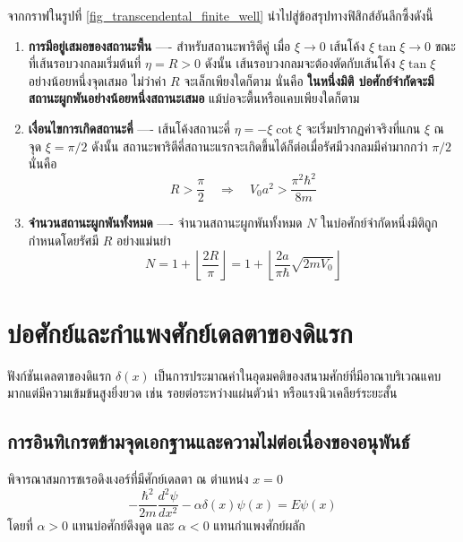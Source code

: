 จากกราฟในรูปที่ \ref{fig_transcendental_finite_well} นำไปสู่ข้อสรุปทางฟิสิกส์อันลึกซึ้งดังนี้
\begin{enumerate}
    \item \textbf{การมีอยู่เสมอของสถานะพื้น} ---- สำหรับสถานะพาริตีคู่ เมื่อ $\xi \to 0$ เส้นโค้ง $\xi\tan\xi \to 0$ ขณะที่เส้นรอบวงกลมเริ่มต้นที่ $\eta = R > 0$ ดังนั้น เส้นรอบวงกลมจะต้องตัดกับเส้นโค้ง $\xi\tan\xi$ อย่างน้อยหนึ่งจุดเสมอ ไม่ว่าค่า $R$ จะเล็กเพียงใดก็ตาม นั่นคือ \textbf{ในหนึ่งมิติ บ่อศักย์จำกัดจะมีสถานะผูกพันอย่างน้อยหนึ่งสถานะเสมอ} แม้บ่อจะตื้นหรือแคบเพียงใดก็ตาม
    
    \item \textbf{เงื่อนไขการเกิดสถานะคี่} ---- เส้นโค้งสถานะคี่ $\eta = -\xi\cot\xi$ จะเริ่มปรากฏค่าจริงที่แกน $\xi$ ณ จุด $\xi = \pi/2$ ดังนั้น สถานะพาริตีคี่สถานะแรกจะเกิดขึ้นได้ก็ต่อเมื่อรัศมีวงกลมมีค่ามากกว่า $\pi/2$ นั่นคือ
    \begin{equation}
    R > \frac{\pi}{2} \quad \Longrightarrow \quad V_0 a^2 > \frac{\pi^2 \hbar^2}{8m}
    \end{equation}
    
    \item \textbf{จำนวนสถานะผูกพันทั้งหมด} ---- จำนวนสถานะผูกพันทั้งหมด $N$ ในบ่อศักย์จำกัดหนึ่งมิติถูกกำหนดโดยรัศมี $R$ อย่างแม่นยำ
    \begin{equation}
    N = 1 + \left\lfloor \frac{2R}{\pi} \right\rfloor = 1 + \left\lfloor \frac{2a}{\pi\hbar}\sqrt{2m V_0} \right\rfloor
    \end{equation}
\end{enumerate}

\section{บ่อศักย์และกำแพงศักย์เดลตาของดิแรก}
\label{sec_delta_potential}

ฟังก์ชันเดลตาของดิแรก $\delta(x)$ เป็นการประมาณค่าในอุดมคติของสนามศักย์ที่มีอาณาบริเวณแคบมากแต่มีความเข้มข้นสูงยิ่งยวด เช่น รอยต่อระหว่างแผ่นตัวนำ หรือแรงนิวเคลียร์ระยะสั้น

\subsection{การอินทิเกรตข้ามจุดเอกฐานและความไม่ต่อเนื่องของอนุพันธ์}
พิจารณาสมการชเรอดิงเงอร์ที่มีศักย์เดลตา ณ ตำแหน่ง $x = 0$
\begin{equation}
-\frac{\hbar^2}{2m} \frac{d^2\psi}{dx^2} - \alpha \delta(x) \psi(x) = E\psi(x)
\end{equation}
โดยที่ $\alpha > 0$ แทนบ่อศักย์ดึงดูด และ $\alpha < 0$ แทนกำแพงศักย์ผลัก

